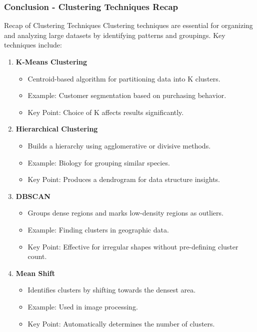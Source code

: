 \documentclass[aspectratio=169]{beamer}
\begin{document}
\begin{frame}[fragile]
    \frametitle{Conclusion - Clustering Techniques Recap}
    \begin{block}{Recap of Clustering Techniques}
        Clustering techniques are essential for organizing and analyzing large datasets by identifying patterns and groupings. Key techniques include:
    \end{block}
    
    \begin{enumerate}
        \item \textbf{K-Means Clustering}
            \begin{itemize}
                \item Centroid-based algorithm for partitioning data into K clusters.
                \item Example: Customer segmentation based on purchasing behavior.
                \item Key Point: Choice of K affects results significantly.
            \end{itemize}
        
        \item \textbf{Hierarchical Clustering}
            \begin{itemize}
                \item Builds a hierarchy using agglomerative or divisive methods.
                \item Example: Biology for grouping similar species.
                \item Key Point: Produces a dendrogram for data structure insights.
            \end{itemize}
        
        \item \textbf{DBSCAN}
            \begin{itemize}
                \item Groups dense regions and marks low-density regions as outliers.
                \item Example: Finding clusters in geographic data.
                \item Key Point: Effective for irregular shapes without pre-defining cluster count.
            \end{itemize}

        \item \textbf{Mean Shift}
            \begin{itemize}
                \item Identifies clusters by shifting towards the densest area.
                \item Example: Used in image processing.
                \item Key Point: Automatically determines the number of clusters.
            \end{itemize}
    \end{enumerate}
\end{frame}
\end{document}
